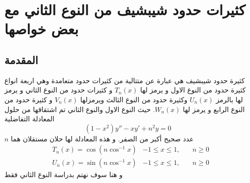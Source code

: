 \chapter{كثيرات حدود شيبشيف من النوع الثاني مع بعض خواصها}
\section{المقدمة}
كثيرة حدود شيبشيف هي عبارة عن متتالية من كثيرات حدود متعامدة وهي اربعة انواع كثيرة حدود من النوع الاول و يرمز لها $T_n(x)$ و كثيرات حدود من النوع الثاني و يرمز لها بالرمز $U_n(x)$ وكثيرة حدود من النوع الثالث  ويرمزلها $V_n(x)$ و كثيرة حدود من النوع الرابع و يرمز لها $W_n(x)$. حيث النوع الاول والنوع الثاني  تم اشتقاقها من حلول المعادلة التفاضلية
\begin{equation}
	(1-x^2)y'' - xy' + n^2 y = 0
\end{equation}
$n$ عدد صحيح أكبر من الصفر. و هذه المعادلة لها حلان مستقلان هما
\begin{align}
	&T_n(x) = \cos (n \cos^{-1} x) & -1\leq x \leq 1, &\quad n\geq 0 \\
	&U_n(x) = \sin (n \cos^{-1} x) & -1\leq x \leq 1, &\quad n\geq 0 
\end{align}
و هنا سوف نهتم بدراسة النوع الثاني فقط

